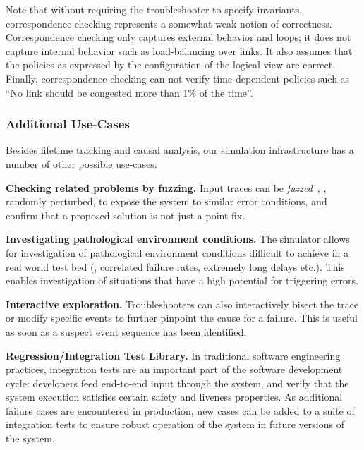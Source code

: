 {

Note that without requiring the troubleshooter to specify invariants,
correspondence checking represents a somewhat weak notion of
correctness. Correspondence checking only captures external behavior and
loops; it does not capture internal behavior such as load-balancing
over links. It also assumes that the policies as expressed by the
configuration of the logical view are correct. Finally, correspondence checking can not verify
time-dependent policies such as ``No link should be congested more than 1\% of
the time''.

\subsubsection{Additional Use-Cases} Besides lifetime tracking and causal analysis, our simulation infrastructure has a
number of other possible use-cases:


\noindent\textbf{Checking related problems by fuzzing.} Input traces can be
\emph{fuzzed}~\cite{Miller:1990:ESR:96267.96279}, \ie{},
randomly perturbed, to expose the system to similar error conditions, and confirm
that a proposed solution is not just a point-fix. 

\noindent\textbf{Investigating pathological environment conditions.} The simulator allows for investigation
of pathological environment conditions difficult to achieve in a real world test bed
(\eg{}, correlated failure rates, extremely long delays etc.). This enables
investigation of situations that have a high potential for triggering errors.

\noindent\textbf{Interactive exploration.} Troubleshooters can also interactively bisect
the trace or modify specific events to further pinpoint the cause for a failure.
This is useful as soon as a suspect event sequence has been identified.

\noindent\textbf{Regression/Integration Test Library.} In traditional software engineering practices,
integration tests are an
important part of the software development cycle: developers feed end-to-end
input through the system, and verify that the system execution satisfies
certain safety and liveness properties. As additional failure cases are encountered in
production, new cases can be added to a suite of integration tests to
ensure robust operation of the system in future versions of the system.

}
